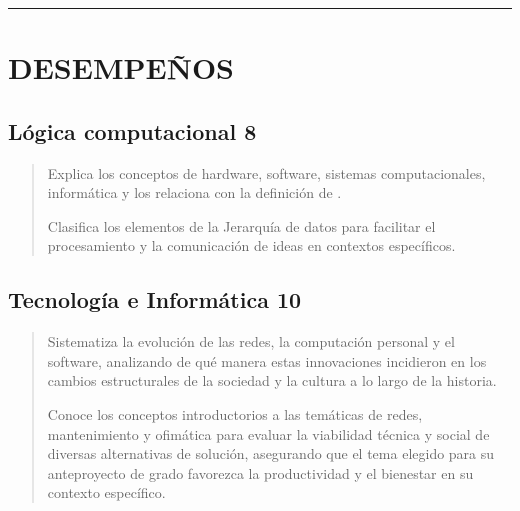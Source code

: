 \documentclass[letterpaper,10pt,spanish]{sphinxmanual}
\begin{document}
\bigskip\hrule\bigskip



\section{DESEMPEÑOS}
\label{\detokenize{0_intro/informacion:desempenos}}

\subsection{Lógica computacional 8}
\label{\detokenize{0_intro/informacion:logica-computacional-8}}\begin{quote}\begin{description}
\sphinxAtStartPar
Explica los conceptos de hardware, software, sistemas computacionales, informática y los relaciona con la definición de .

\sphinxAtStartPar
Clasifica los elementos de la Jerarquía de datos para facilitar el procesamiento y la comunicación de ideas en contextos específicos.

\end{description}\end{quote}


\subsection{Tecnología e Informática 10}
\label{\detokenize{0_intro/informacion:tecnologia-e-informatica-10}}\begin{quote}\begin{description}
\sphinxAtStartPar
Sistematiza la evolución de las redes, la computación personal y el software, analizando de qué manera estas innovaciones incidieron en los cambios estructurales de la sociedad y la cultura a lo largo de la historia.

\sphinxAtStartPar
Conoce los conceptos introductorios a las temáticas de redes, mantenimiento y ofimática para evaluar la viabilidad técnica y social de diversas alternativas de solución, asegurando que el tema elegido para su anteproyecto de grado favorezca la productividad y el bienestar en su contexto específico.

\end{description}\end{quote}
\end{document}
